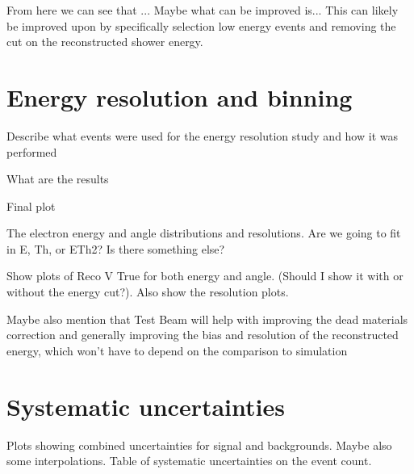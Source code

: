 \begin{figure}
\begin{scriptsize}
\label{tab:CutflowTableBackground}
\end{scriptsize}
\end{figure}
\fi

From here we can see that ... Maybe what can be improved is...
This can likely be improved upon by specifically selection low energy events and removing the cut on the reconstructed shower energy. 


\section{Energy resolution and binning}\label{sec:NuMMResolution}
Describe what events were used for the energy resolution study and how it was performed

What are the results

Final plot

The electron energy and angle distributions and resolutions. Are we going to fit in E, Th, or ETh2? Is there something else?

Show plots of Reco V True for both energy and angle. (Should I show it with or without the energy cut?). Also show the resolution plots.

Maybe also mention that Test Beam will help with improving the dead materials correction and generally improving the bias and resolution of the reconstructed energy, which won't have to depend on the comparison to simulation

\section{Systematic uncertainties}\label{sec:NuMMSystematics}
\iffalse
{}
Plots showing combined uncertainties for signal and backgrounds. Maybe also some interpolations. Table of systematic uncertainties on the event count.

